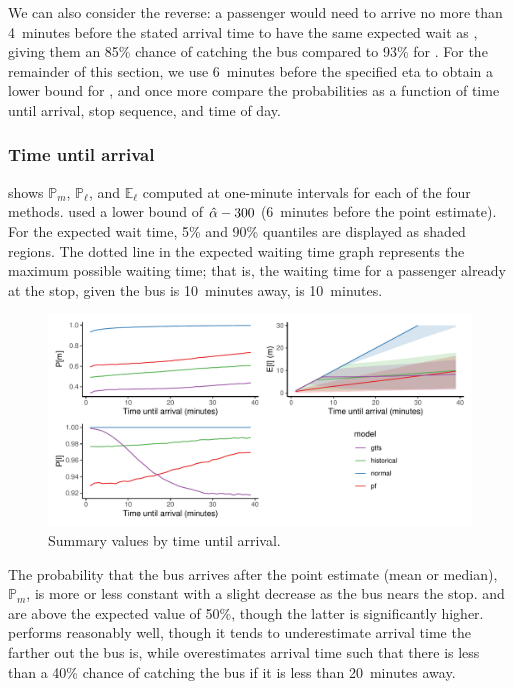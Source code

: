 We can also consider the reverse: a passenger would need to arrive no more than 4~minutes before the stated arrival time to have the same expected wait as \Fpf{}, giving them an 85\% chance of catching the bus compared to 93\% for \Fpf{}. For the remainder of this section, we use 6~minutes before the specified \gls{eta} to obtain a lower bound for \Fsched{}, and once more compare the probabilities as a function of time until arrival, stop sequence, and time of day.



\subsubsection{Time until arrival}

 shows $\mathbb{P}_m$, $\mathbb{P}_\ell$, and $\mathbb{E}_\ell$ computed at one-minute intervals for each of the four methods. \Fsched{} used a lower bound of $\hat{\alpha} - 300$ (6~minutes before the point estimate). For the expected wait time, 5\% and 90\% quantiles are displayed as shaded regions. The dotted line in the expected waiting time graph represents the maximum possible waiting time; that is, the waiting time for a passenger already at the stop, given the bus is 10~minutes away, is 10~minutes.


\begin{knitrout}\small
{}\color{fgcolor}\begin{figure}
\includegraphics[width=\textwidth]{figure/model_results_pr_time-1} \caption[Summary values by time until arrival]{Summary values by time until arrival.}\label{fig:model_results_pr_time}
\end{figure}


\end{knitrout}


The probability that the bus arrives after the point estimate (mean or median), $\mathbb{P}_m$, is more or less constant with a slight decrease as the bus nears the stop. \Fpf{} and \Fnorm{} are above the expected value of 50\%, though the latter is significantly higher. \Fnorm{} performs reasonably well, though it tends to underestimate arrival time the farther out the bus is, while \Fsched{} overestimates arrival time such that there is less than a 40\% chance of catching the bus if it is less than 20~minutes away.


